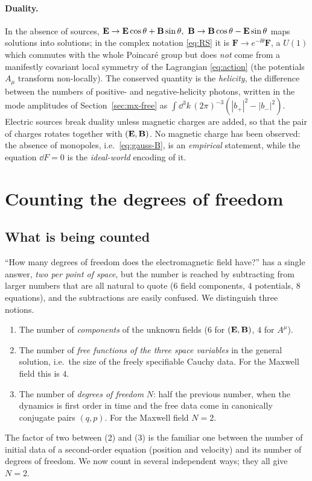 \paragraph{Duality.}  In the absence of sources,
$\vE\to\vE\cos\theta+\vB\sin\theta,\ \vB\to\vB\cos\theta-\vE\sin\theta$
maps solutions into solutions; in the complex notation \eqref{eq:RS}
it is $\mathbf F\to e^{-\ii\theta}\mathbf F$, a $U(1)$ which commutes
with the whole Poincaré group but does \emph{not} come from a
manifestly covariant local symmetry of the Lagrangian \eqref{eq:action}
(the potentials $A_\mu$ transform non-locally).  The conserved quantity
is the \emph{helicity}, the difference between the numbers of
positive- and negative-helicity photons, written in the mode amplitudes
of Section~\ref{sec:mx-free} as $\int\dd^3k\,(2\pi)^{-3}(|b_+|^2-|b_-|^2)$.  Electric sources break duality unless magnetic charges are added, so
that the pair of charges rotates together with $(\mathbf{E},\mathbf{B})$.  No magnetic
charge has been observed: the absence of monopoles, i.e.\
\eqref{eq:gauss-B}, is an \emph{empirical} statement, while the
equation $\dd F=0$ is the \emph{ideal-world} encoding of it.

\section{Counting the degrees of freedom}\label{sec:mx-dof}

\subsection{What is being counted}

``How many degrees of freedom does the electromagnetic field have?'' has
a single answer, \emph{two per point of space}, but the number is
reached by subtracting from larger numbers that are all natural to
quote ($6$ field components, $4$ potentials, $8$ equations), and the
subtractions are easily confused.  We distinguish three notions.
\begin{enumerate}
\item The number of \emph{components} of the unknown fields ($6$ for
  $(\mathbf{E},\mathbf{B})$, $4$ for $A^\mu$).
\item The number of \emph{free functions of the three space variables}
  in the general solution, i.e.\ the size of the freely specifiable
  Cauchy data.  For the Maxwell field this is $4$.
\item The number of \emph{degrees of freedom} $N$: half the previous
  number, when the dynamics is first order in time and the free data
  come in canonically conjugate pairs $(q,p)$.  For the Maxwell field
  $N=2$.
\end{enumerate}
The factor of two between (2) and (3) is the familiar one between the
number of initial data of a second-order equation (position and
velocity) and its number of degrees of freedom.  We now count in
several independent ways; they all give $N=2$.


